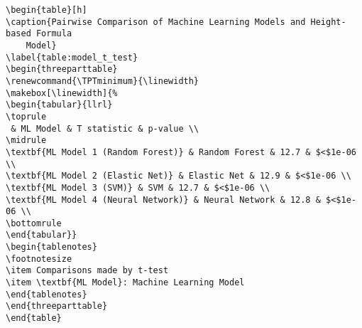 \documentclass[11pt]{article}
\begin{document}
\begin{Verbatim}[tabsize=4]
\begin{table}[h]
\caption{Pairwise Comparison of Machine Learning Models and Height-based Formula
	Model}
\label{table:model_t_test}
\begin{threeparttable}
\renewcommand{\TPTminimum}{\linewidth}
\makebox[\linewidth]{%
\begin{tabular}{llrl}
\toprule
 & ML Model & T statistic & p-value \\
\midrule
\textbf{ML Model 1 (Random Forest)} & Random Forest & 12.7 & $<$1e-06 \\
\textbf{ML Model 2 (Elastic Net)} & Elastic Net & 12.9 & $<$1e-06 \\
\textbf{ML Model 3 (SVM)} & SVM & 12.7 & $<$1e-06 \\
\textbf{ML Model 4 (Neural Network)} & Neural Network & 12.8 & $<$1e-06 \\
\bottomrule
\end{tabular}}
\begin{tablenotes}
\footnotesize
\item Comparisons made by t-test
\item \textbf{ML Model}: Machine Learning Model
\end{tablenotes}
\end{threeparttable}
\end{table}

\end{Verbatim}




\end{document}
